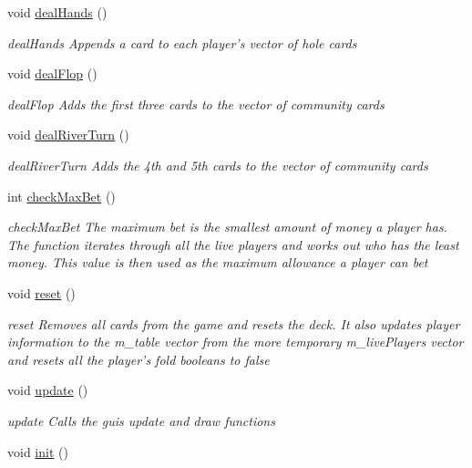 \begin{DoxyCompactItemize}
void \hyperlink{classdealerLib_a328a5d21d3bdf0686fe5bcfba2f7015b}{deal\-Hands} ()
\begin{DoxyCompactList}\small\item\em deal\-Hands Appends a card to each player's vector of hole cards \end{DoxyCompactList}\item 
void \hyperlink{classdealerLib_a950bb045bf57da8e864c4d175230db2c}{deal\-Flop} ()
\begin{DoxyCompactList}\small\item\em deal\-Flop Adds the first three cards to the vector of community cards \end{DoxyCompactList}\item 
void \hyperlink{classdealerLib_a4cd945f94cf450808f8c3400c323819c}{deal\-River\-Turn} ()
\begin{DoxyCompactList}\small\item\em deal\-River\-Turn Adds the 4th and 5th cards to the vector of community cards \end{DoxyCompactList}\item 
int \hyperlink{classdealerLib_ab4761cf75f036955ff707d30eab5733b}{check\-Max\-Bet} ()
\begin{DoxyCompactList}\small\item\em check\-Max\-Bet The maximum bet is the smallest amount of money a player has. The function iterates through all the live players and works out who has the least money. This value is then used as the maximum allowance a player can bet \end{DoxyCompactList}\item 
void \hyperlink{classdealerLib_adde6b485d725ef6c121f820fceb656c1}{reset} ()
\begin{DoxyCompactList}\small\item\em reset Removes all cards from the game and resets the deck. It also updates player information to the m\-\_\-table vector from the more temporary m\-\_\-live\-Players vector and resets all the player's fold booleans to false \end{DoxyCompactList}\item 
void \hyperlink{classdealerLib_ac0455246849f0b14c217d14ccca5af4f}{update} ()
\begin{DoxyCompactList}\small\item\em update Calls the guis update and draw functions \end{DoxyCompactList}\item 
void \hyperlink{classdealerLib_a3904a233153d0b6c7437ecd221b7db9d}{init} ()

\end{DoxyCompactItemize}
